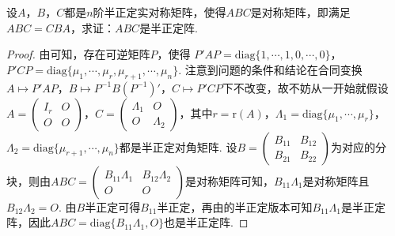 \documentclass[../../main.tex]{subfiles}
\begin{document}
\begin{proposition}\label{proposition:例9.84}
设\(A\)，\(B\)，\(C\)都是\(n\)阶半正定实对称矩阵，使得\(ABC\)是对称矩阵，即满足\(ABC = CBA\)，求证：\(ABC\)是半正定阵.
\end{proposition}
\begin{proof}
由可知，存在可逆矩阵\(P\)，使得
\(P'AP = \mathrm{diag}\{1,\cdots,1,0,\cdots,0\}\)，\(P'CP = \mathrm{diag}\{\mu_1,\cdots,\mu_r,\mu_{r + 1},\cdots,\mu_n\}\).
注意到问题的条件和结论在合同变换\(A\mapsto P'AP\)，\(B\mapsto P^{-1}B(P^{-1})'\)，\(C\mapsto P'CP\)下不改变，故不妨从一开始就假设\(A=\begin{pmatrix}I_r&O\\O&O\end{pmatrix}\)，\(C=\begin{pmatrix}\Lambda_1&O\\O&\Lambda_2\end{pmatrix}\)，其中\(r = \mathrm{r}(A)\)，\(\Lambda_1 = \mathrm{diag}\{\mu_1,\cdots,\mu_r\}\)，\(\Lambda_2 = \mathrm{diag}\{\mu_{r + 1},\cdots,\mu_n\}\)都是半正定对角矩阵. 设\(B=\begin{pmatrix}B_{11}&B_{12}\\B_{21}&B_{22}\end{pmatrix}\)为对应的分块，则由\(ABC=\begin{pmatrix}B_{11}\Lambda_1&B_{12}\Lambda_2\\O&O\end{pmatrix}\)是对称矩阵可知，\(B_{11}\Lambda_1\)是对称矩阵且\(B_{12}\Lambda_2 = O\). 由\(B\)半正定可得\(B_{11}\)半正定，再由的半正定版本可知\(B_{11}\Lambda_1\)是半正定阵，因此\(ABC = \mathrm{diag}\{B_{11}\Lambda_1,O\}\)也是半正定阵. 
\end{proof}
\end{document}
